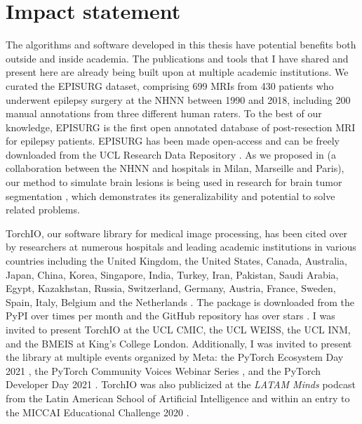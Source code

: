 \chapter{Impact statement}

The algorithms and software developed in this thesis have potential benefits both outside and inside academia.
The publications and tools that I have shared and present here are already being built upon at multiple academic institutions.
We curated the EPISURG dataset, comprising 699 \acp{MRI} from 430 patients who underwent epilepsy surgery at the \ac{NHNN} between 1990 and 2018, including 200 manual annotations from three different human raters.
To the best of our knowledge, EPISURG is the first open annotated database of post-resection \ac{MRI} for epilepsy patients.
EPISURG has been made open-access and can be freely downloaded from the UCL Research Data Repository \cite{perez-garcia_episurg_2020}.
As we proposed in \cite{perez-garcia_self-supervised_2021} (a collaboration between the \ac{NHNN} and hospitals in Milan, Marseille and Paris), our method to simulate brain lesions is being used in research for brain tumor segmentation \cite{zhang_self-supervised_2021}, which demonstrates its generalizability and potential to solve related problems.

TorchIO, our software library for medical image processing,
has been cited over \torchiocitations by researchers
at numerous hospitals and leading academic institutions in various countries including
the United Kingdom, the United States, Canada, Australia, Japan, China, Korea, Singapore, India, Turkey, Iran, Pakistan, Saudi Arabia, Egypt, Kazakhstan, Russia, Switzerland, Germany, Austria, France, Sweden, Spain, Italy, Belgium and the Netherlands%
.
The package is downloaded from the \ac{PyPI} over \torchiomonthdownloads times per month%
%
and the GitHub repository has over \torchiostars stars%
.
I was invited to present TorchIO at
the UCL \ac{CMIC},
the UCL \ac{WEISS},
the UCL \ac{INM}, and
the \ac{BMEIS} at King's College London.
Additionally, I was invited to present the library at multiple events organized by Meta: the PyTorch Ecosystem Day 2021%
,
the PyTorch Community Voices Webinar Series%
,
and the PyTorch Developer Day 2021%
.
TorchIO was also publicized at the \textit{LATAM Minds} podcast from the Latin American School of Artificial Intelligence%
and within an entry to the MICCAI Educational Challenge 2020%
.

